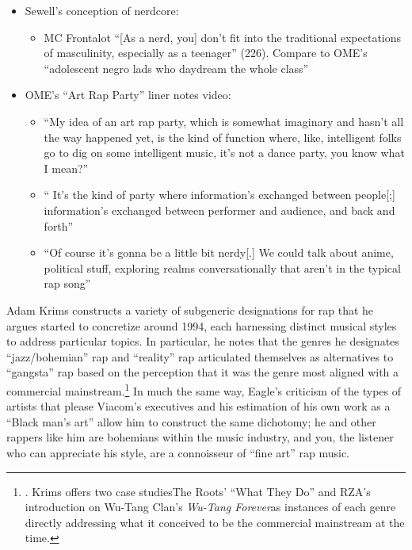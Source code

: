    \begin{itemize}
    \item Sewell's conception of nerdcore:
            \begin{itemize}
                \item MC Frontalot ``[As a nerd, you] don't fit into the traditional expectations of 
                masculinity, especially as a teenager'' (226). Compare to OME's ``adolescent negro lads who 
                daydream the whole class''
            \end{itemize}
        \item OME's ``Art Rap Party'' liner notes video:
            \begin{itemize}
                \item ``My idea of an art rap party, which is somewhat imaginary and hasn't all the way
                happened yet, is the kind of function where, like, intelligent folks go to dig on some
                intelligent music, \textellipsis it's not a dance party, you know what I mean?''
                \item ``  It's the kind of party where information's exchanged between people[;] 
                information's exchanged between performer and audience, and back and forth'' 
                \item ``Of course it's gonna be a little bit nerdy[.] \textellipsis We could talk about 
                anime, \textellipsis political stuff, exploring realms conversationally that aren't in the 
                typical rap song''
            \end{itemize}
    \end{itemize}

Adam Krims constructs a variety of subgeneric designations for rap that he argues started to concretize
around 1994, each harnessing distinct musical styles to address particular topics. In particular, he 
notes that the genres he designates ``jazz/bohemian'' rap and ``reality'' rap articulated themselves 
as alternatives  to ``gangsta'' rap based on the perception that it was the genre most aligned with
a commercial mainstream.\footnote{
    \autocite[64--65]{adamkrimsRapMusicPoetics2000}. Krims offers two case studies\textemdash The Roots' 
    ``What They Do'' and RZA's introduction on Wu-Tang Clan's \textit{Wu-Tang Forever}\textemdash as 
    instances of each genre directly addressing what it conceived to be the commercial mainstream at
    the time.}
In much the same way, Eagle's criticism of the types of artists that please Viacom's executives and his 
estimation of his own work as a ``Black man's art'' allow him to construct the same dichotomy; he and
other rappers like him are bohemians within the music industry, and you, the listener who can appreciate
his style, are a connoisseur of ``fine art'' rap music.

